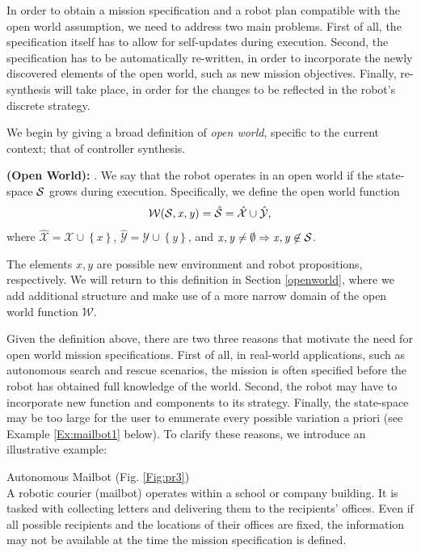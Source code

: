In order to obtain a mission specification and a robot plan compatible with the open world assumption, we need to address two main problems. First of all, the specification itself has to allow for self-updates during execution. Second, the specification has to be automatically re-written, in order to incorporate the newly discovered elements of the open world, such as new mission objectives. Finally, re-synthesis will take place, in order for the changes to be reflected in the robot's discrete strategy.

We begin by giving a broad definition of \emph{open world}, specific to the current context; that of controller synthesis.

\begin{myDefinition}\label{Def:openworld}
	\textbf{(Open World):} . We say that the robot operates in an open world if the state-space $\mathcal{S}$ grows during execution. Specifically, we define the open world function $$\mathcal{W}(\mathcal{S}, \mathit{x}, \mathit{y}) = \hat{\mathcal{S}} = \hat{\mathcal{X}} \cup \hat{\mathcal{Y}},$$
	where $\hat{\mathcal{X}} = \mathcal{X} \cup \left\{ \mathit{x} \right\}$, $\hat{\mathcal{Y}} = \mathcal{Y} \cup \left\{ \mathit{y} \right\}$, and $\mathit{x}, \mathit{y} \neq \emptyset \Rightarrow \mathit{x}, \mathit{y} \not \in \mathcal{S} $.
	\end{myDefinition} 
The elements $\mathit{x}, \mathit{y}$ are possible new environment and robot propositions, respectively. We will return to this definition in Section \ref{openworld}, where we add additional structure and make use of a more narrow domain of the open world function $\mathcal{W}$.

Given the definition above, there are two three reasons that motivate the need for open world mission specifications. First of all, in real-world applications, such as autonomous search and rescue scenarios, the mission is often specified before the robot has obtained full knowledge of the world. Second, the robot may have to incorporate new function and components to its strategy. Finally, the state-space may be too large for the user to enumerate every possible variation a priori (see Example \ref{Ex:mailbot1} below).  To clarify these reasons, we introduce an illustrative example:

\begin{myExample}\label{Ex:mailbot1} Autonomous Mailbot (Fig. \ref{Fig:pr3})\\
	A robotic courier (mailbot) operates within a school or company building. It is tasked with collecting letters and delivering them to the recipients' offices. Even if all possible recipients and the locations of their offices are fixed, the information may not be available at the time the mission specification is defined. 
\end{myExample}


